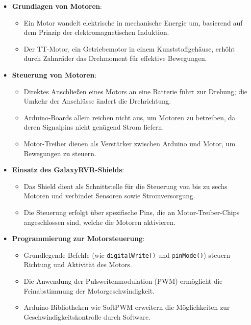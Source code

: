 \documentclass{vorlage-design-main}
\begin{document}
\begin{itemize}

\item
  \textbf{Grundlagen von Motoren}:

  \begin{itemize}
  
  \item
    Ein Motor wandelt elektrische in mechanische Energie um, basierend
    auf dem Prinzip der elektromagnetischen Induktion.
  \item
    Der TT-Motor, ein Getriebemotor in einem Kunststoffgehäuse, erhöht
    durch Zahnräder das Drehmoment für effektive Bewegungen.
  \end{itemize}
\item
  \textbf{Steuerung von Motoren}:

  \begin{itemize}
  
  \item
    Direktes Anschließen eines Motors an eine Batterie führt zur
    Drehung; die Umkehr der Anschlüsse ändert die Drehrichtung.
  \item
    Arduino-Boards allein reichen nicht aus, um Motoren zu betreiben, da
    deren Signalpins nicht genügend Strom liefern.
  \item
    Motor-Treiber dienen als Verstärker zwischen Arduino und Motor, um
    Bewegungen zu steuern.
  \end{itemize}
\item
  \textbf{Einsatz des GalaxyRVR-Shields}:

  \begin{itemize}
  
  \item
    Das Shield dient als Schnittstelle für die Steuerung von bis zu
    sechs Motoren und verbindet Sensoren sowie Stromversorgung.
  \item
    Die Steuerung erfolgt über spezifische Pins, die an
    Motor-Treiber-Chips angeschlossen sind, welche die Motoren
    aktivieren.
  \end{itemize}
\item
  \textbf{Programmierung zur Motorsteuerung}:

  \begin{itemize}
  
  \item
    Grundlegende Befehle (wie \verb|digitalWrite()|
    und \verb|pinMode()|) steuern Richtung und
    Aktivität des Motors.
  \item
    Die Anwendung der Pulsweitenmodulation (PWM) ermöglicht die
    Feinabstimmung der Motorgeschwindigkeit.
  \item
    Arduino-Bibliotheken wie SoftPWM erweitern die Möglichkeiten zur
    Geschwindigkeitskontrolle durch Software.
  \end{itemize}
\end{itemize}
\end{document}
